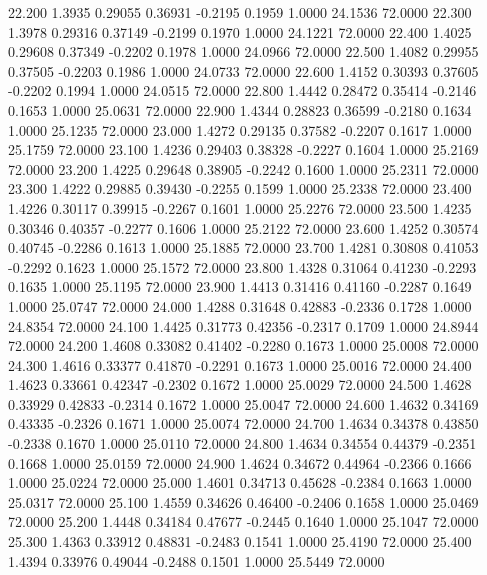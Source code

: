   22.200   1.3935   0.29055   0.36931  -0.2195   0.1959   1.0000  24.1536  72.0000
  22.300   1.3978   0.29316   0.37149  -0.2199   0.1970   1.0000  24.1221  72.0000
  22.400   1.4025   0.29608   0.37349  -0.2202   0.1978   1.0000  24.0966  72.0000
  22.500   1.4082   0.29955   0.37505  -0.2203   0.1986   1.0000  24.0733  72.0000
  22.600   1.4152   0.30393   0.37605  -0.2202   0.1994   1.0000  24.0515  72.0000
  22.800   1.4442   0.28472   0.35414  -0.2146   0.1653   1.0000  25.0631  72.0000
  22.900   1.4344   0.28823   0.36599  -0.2180   0.1634   1.0000  25.1235  72.0000
  23.000   1.4272   0.29135   0.37582  -0.2207   0.1617   1.0000  25.1759  72.0000
  23.100   1.4236   0.29403   0.38328  -0.2227   0.1604   1.0000  25.2169  72.0000
  23.200   1.4225   0.29648   0.38905  -0.2242   0.1600   1.0000  25.2311  72.0000
  23.300   1.4222   0.29885   0.39430  -0.2255   0.1599   1.0000  25.2338  72.0000
  23.400   1.4226   0.30117   0.39915  -0.2267   0.1601   1.0000  25.2276  72.0000
  23.500   1.4235   0.30346   0.40357  -0.2277   0.1606   1.0000  25.2122  72.0000
  23.600   1.4252   0.30574   0.40745  -0.2286   0.1613   1.0000  25.1885  72.0000
  23.700   1.4281   0.30808   0.41053  -0.2292   0.1623   1.0000  25.1572  72.0000
  23.800   1.4328   0.31064   0.41230  -0.2293   0.1635   1.0000  25.1195  72.0000
  23.900   1.4413   0.31416   0.41160  -0.2287   0.1649   1.0000  25.0747  72.0000
  24.000   1.4288   0.31648   0.42883  -0.2336   0.1728   1.0000  24.8354  72.0000
  24.100   1.4425   0.31773   0.42356  -0.2317   0.1709   1.0000  24.8944  72.0000
  24.200   1.4608   0.33082   0.41402  -0.2280   0.1673   1.0000  25.0008  72.0000
  24.300   1.4616   0.33377   0.41870  -0.2291   0.1673   1.0000  25.0016  72.0000
  24.400   1.4623   0.33661   0.42347  -0.2302   0.1672   1.0000  25.0029  72.0000
  24.500   1.4628   0.33929   0.42833  -0.2314   0.1672   1.0000  25.0047  72.0000
  24.600   1.4632   0.34169   0.43335  -0.2326   0.1671   1.0000  25.0074  72.0000
  24.700   1.4634   0.34378   0.43850  -0.2338   0.1670   1.0000  25.0110  72.0000
  24.800   1.4634   0.34554   0.44379  -0.2351   0.1668   1.0000  25.0159  72.0000
  24.900   1.4624   0.34672   0.44964  -0.2366   0.1666   1.0000  25.0224  72.0000
  25.000   1.4601   0.34713   0.45628  -0.2384   0.1663   1.0000  25.0317  72.0000
  25.100   1.4559   0.34626   0.46400  -0.2406   0.1658   1.0000  25.0469  72.0000
  25.200   1.4448   0.34184   0.47677  -0.2445   0.1640   1.0000  25.1047  72.0000
  25.300   1.4363   0.33912   0.48831  -0.2483   0.1541   1.0000  25.4190  72.0000
  25.400   1.4394   0.33976   0.49044  -0.2488   0.1501   1.0000  25.5449  72.0000
